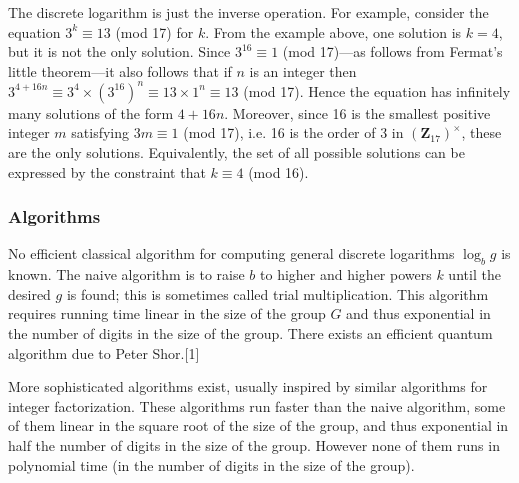 \documentclass[a4paper, 11pt]{article}
\begin{document}
The discrete logarithm is just the inverse operation. For example, consider the equation $3^k \equiv 13$ (mod 17) for $k$. From the example above, one solution is $k = 4$, but it is not the only solution. Since $3^{16} \equiv 1$ (mod 17)---as follows from Fermat's little theorem---it also follows that if $n$ is an integer then $3^{4+16n} \equiv 3^4 \times (3^{16})^n \equiv 13 \times 1^n \equiv 13 $ (mod 17). Hence the equation has infinitely many solutions of the form $4 + 16n$. Moreover, since 16 is the smallest positive integer $m$ satisfying $3m \equiv 1$ (mod 17), i.e. 16 is the order of 3 in $(\mathbf{Z}_{17})^\times$, these are the only solutions. Equivalently, the set of all possible solutions can be expressed by the constraint that $k \equiv 4 $  (mod 16).

\subsubsection{Algorithms}
No efficient classical algorithm for computing general discrete logarithms $\log _b g$ is known. The naive algorithm is to raise $b$ to higher and higher powers $k$ until the desired $g$ is found; this is sometimes called trial multiplication. This algorithm requires running time linear in the size of the group $G$ and thus exponential in the number of digits in the size of the group. There exists an efficient quantum algorithm due to Peter Shor.[1]

More sophisticated algorithms exist, usually inspired by similar algorithms for integer factorization. These algorithms run faster than the naive algorithm, some of them linear in the square root of the size of the group, and thus exponential in half the number of digits in the size of the group. However none of them runs in polynomial time (in the number of digits in the size of the group).

\end{document}
